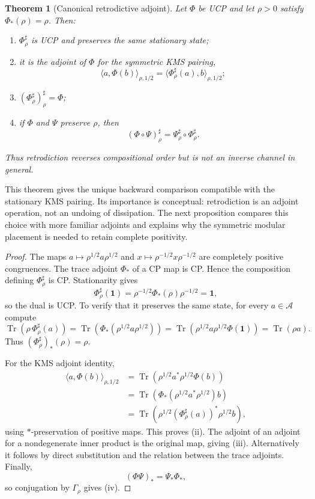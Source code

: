 \documentclass[11pt]{article}
\newtheorem{theorem}{Theorem}[section]
\theoremstyle{definition}
\theoremstyle{remark}
\newcommand{\one}{\mathbf 1}
\newcommand{\Tr}{\operatorname{Tr}}
\newcommand{\A}{\mathcal A}
\newcommand{\GammaR}{\Gamma_{\rho}}
\begin{document}
\begin{theorem}[Canonical retrodictive adjoint]
\label{thm:petz-properties}
Let $\Phi$ be UCP and let $\rho>0$ satisfy $\Phi_*(\rho)=\rho$.  Then:
\begin{enumerate}[label=\textup{(\roman*)},leftmargin=2.4em]
\item $\Phi_\rho^\sharp$ is UCP and preserves the same stationary state;
\item it is the adjoint of $\Phi$ for the symmetric KMS pairing,
      \[
      \langle a,\Phi(b)\rangle_{\rho,1/2}
      =\langle\Phi_\rho^\sharp(a),b\rangle_{\rho,1/2};
      \]
\item $(\Phi_\rho^\sharp)_\rho^\sharp=\Phi$;
\item if $\Phi$ and $\Psi$ preserve $\rho$, then
      \[
      (\Phi\circ\Psi)_\rho^\sharp
      =\Psi_\rho^\sharp\circ\Phi_\rho^\sharp.
      \]
\end{enumerate}
Thus retrodiction reverses compositional order but is not an inverse channel in
general.
\end{theorem}

This theorem gives the unique backward comparison compatible with the stationary
KMS pairing.  Its importance is conceptual: retrodiction is an adjoint operation,
not an undoing of dissipation.  The next proposition compares this choice with
more familiar adjoints and explains why the symmetric modular placement is needed
to retain complete positivity.

\begin{proof}
The maps $a\mapsto\rho^{1/2}a\rho^{1/2}$ and
$x\mapsto\rho^{-1/2}x\rho^{-1/2}$ are completely positive congruences.
The trace adjoint $\Phi_*$ of a CP map is CP.  Hence the composition defining
$\Phi_\rho^\sharp$ is CP.  Stationarity gives
\[
 \Phi_\rho^\sharp(\one)
 =\rho^{-1/2}\Phi_*(\rho)\rho^{-1/2}=\one,
\]
so the dual is UCP.  To verify that it preserves the same state, for every
$a\in\A$ compute
\[
 \Tr\!\left(\rho\,\Phi_\rho^\sharp(a)\right)
 =\Tr\!\left(\Phi_*(\rho^{1/2}a\rho^{1/2})\right)
 =\Tr\!\left(\rho^{1/2}a\rho^{1/2}\Phi(\one)\right)
 =\Tr(\rho a).
\]
Thus $(\Phi_\rho^\sharp)_*(\rho)=\rho$.

For the KMS adjoint identity,
\begin{align*}
 \langle a,\Phi(b)\rangle_{\rho,1/2}
 &=\Tr\!\left(\rho^{1/2}a^*\rho^{1/2}\Phi(b)\right)\\
 &=\Tr\!\left(\Phi_*(\rho^{1/2}a^*\rho^{1/2})b\right)\\
 &=\Tr\!\left(\rho^{1/2}(\Phi_\rho^\sharp(a))^*
                \rho^{1/2}b\right),
\end{align*}
using $*$-preservation of positive maps.  This proves (ii).  The adjoint of an
adjoint for a nondegenerate inner product is the original map, giving (iii).
Alternatively it follows by direct substitution and the relation between the
trace adjoints.  Finally,
\[
 (\Phi\Psi)_*=\Psi_*\Phi_*,
\]
so conjugation by $\GammaR$ gives (iv).
\end{proof}
\end{document}
